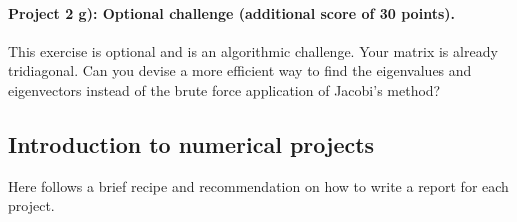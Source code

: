 \documentclass[%
oneside,                 %
final,                   %
10pt]{article}
\begin{document}
\paragraph{Project 2 g): Optional challenge (additional score of 30 points).}
This exercise is optional and is an algorithmic challenge. Your matrix is already tridiagonal. 
Can you devise a more efficient way to find the eigenvalues and eigenvectors instead of the brute force application of Jacobi's method? 



\subsection*{Introduction to numerical projects}

Here follows a brief recipe and recommendation on how to write a report for each
project.
\end{document}
